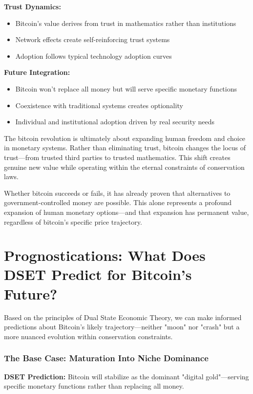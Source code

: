 \documentclass[11pt,oneside]{book}
\begin{document}
\textbf{Trust Dynamics:}
\begin{itemize}
\item Bitcoin's value derives from trust in mathematics rather than institutions
\item Network effects create self-reinforcing trust systems
\item Adoption follows typical technology adoption curves
\end{itemize}

\textbf{Future Integration:}
\begin{itemize}
\item Bitcoin won't replace all money but will serve specific monetary functions
\item Coexistence with traditional systems creates optionality
\item Individual and institutional adoption driven by real security needs
\end{itemize}

The bitcoin revolution is ultimately about expanding human freedom and choice in monetary systems. Rather than eliminating trust, bitcoin changes the locus of trust—from trusted third parties to trusted mathematics. This shift creates genuine new value while operating within the eternal constraints of conservation laws.

Whether bitcoin succeeds or fails, it has already proven that alternatives to government-controlled money are possible. This alone represents a profound expansion of human monetary options—and that expansion has permanent value, regardless of bitcoin's specific price trajectory.

\section{Prognostications: What Does DSET Predict for Bitcoin's Future?}

Based on the principles of Dual State Economic Theory, we can make informed predictions about Bitcoin's likely trajectory—neither "moon" nor "crash" but a more nuanced evolution within conservation constraints.

\subsubsection{The Base Case: Maturation Into Niche Dominance}

\textbf{DSET Prediction:} Bitcoin will stabilize as the dominant "digital gold"—serving specific monetary functions rather than replacing all money.
\end{document}
